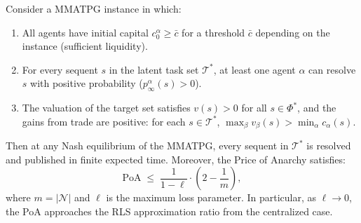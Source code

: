 \begin{theorem}\label{thm:bounded-poa}
Consider a MMATPG instance in which:
\begin{enumerate}
    \item[(i)] All agents have initial capital $c^\alpha_0 \ge \bar{c}$ for a threshold $\bar{c}$ depending on the instance (sufficient liquidity).
    \item[(ii)] For every sequent $s$ in the latent task set $\mathcal{T}^*$, at least one agent $\alpha$ can resolve $s$ with positive probability ($p^\alpha_\infty(s) > 0$).
    \item[(iii)] The valuation of the target set satisfies $v(s) > 0$ for all $s\in\Phi^*$, and the gains from trade are positive: for each $s\in\mathcal{T}^*$, $\max_\beta v_\beta(s) > \min_\alpha c_\alpha(s)$.
\end{enumerate}
Then at any Nash equilibrium of the MMATPG, every sequent in $\mathcal{T}^*$ is resolved and published in finite expected time. Moreover, the Price of Anarchy satisfies:
\[
\mathrm{PoA} \;\le\; \frac{1}{1-\ell}\cdot\left(2-\frac{1}{m}\right),
\]
where $m = |\mathcal{N}|$ and $\ell$ is the maximum loss parameter. In particular, as $\ell\to 0$, the PoA approaches the RLS approximation ratio from the centralized case.
\end{theorem}

